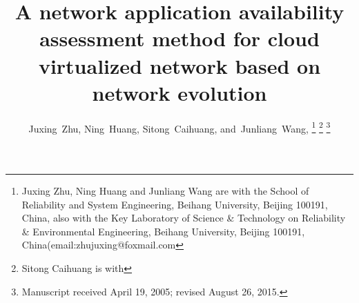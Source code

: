 \documentclass[journal]{IEEEtran}
\begin{document}
%
    \title{A network application availability assessment method for cloud virtualized network based on network evolution}
%
%
%

    \author{Juxing~Zhu,
        Ning~Huang,
        Sitong~Caihuang,
        and~Junliang~Wang, %
        \thanks{Juxing Zhu, Ning Huang and Junliang Wang are with the School of Reliability and System Engineering, Beihang University, Beijing 100191, China, also with the Key Laboratory of Science \& Technology on Reliability \& Environmental Engineering, Beihang University, Beijing 100191, China(email:zhujuxing@foxmail.com}%
        \thanks{Sitong Caihuang is with}%
        \thanks{Manuscript received April 19, 2005; revised August 26, 2015.}}

% 
%
\end{document}
